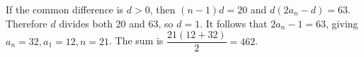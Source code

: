 If the common difference is $d>0$, then $(n-1)d=20$ and $d(2a_n-d)=63$. Therefore $d$ divides both 20 and 63, so $d=1$. It follows that $2a_n-1=63$, giving $a_n=32,a_1=12,n=21$. The sum is $\dfrac{21(12+32)}{2}=\boxed{462}$.
